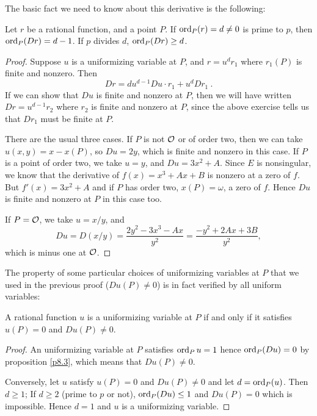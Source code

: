 The basic fact we need to know about this derivative is the following:

\begin{prop}
\label{p8.3}
Let $r$ be a rational function, and a point $P$. If $\operatorname{ord}_{P}(r)=d\neq 0$ is prime to $p$, then $\operatorname{ord}_{P}(Dr)=d-1$. If $p$ divides $d$,  $\operatorname{ord}_{P}(Dr)\geq d$.
\end{prop}

\begin{proof} Suppose $u$ is a uniformizing variable at $P$, and $r=u^{d}r_{1}$ where $r_{1}(P)$ is finite and nonzero. Then
$$
Dr=du^{d-1}Du\cdot r_{1}+u^{d}Dr_{1}\ .
$$
If we can show that $Du$ is finite and nonzero at $P$, then we will have written $Dr=u^{d-1}r_{2}$ where $r_{2}$ is finite and nonzero at $P$, since the above exercise tells us that $Dr_{1}$ must be finite at $P$. 

There are the usual three cases. If $P$ is not $\mathcal{O}$ or of order two, then we can take $u(x, y)=x-x(P)$, so $Du=2y$, which is finite and nonzero in this case. If $P$ is a point of order two, we take $u=y$, and $Du=3x^{2}+A$. Since $E$ is nonsingular, we know that the derivative of $f(x)=x^{3}+Ax+B$ is nonzero at a zero of $f$. But $f'(x)=3x^{2}+A$ and if $P$ has order two, $ x(P)=\omega$, a zero of $f$. Hence $Du$ is finite and nonzero at $P$ in this case too.

If $P=\mathcal{O}$, we take $u=x/y$, and
$$
Du=D(x/y)=\frac{2y^{2}-3x^{3}-Ax}{y^{2}}=\frac{-y^{2}+2Ax+3B}{y^{2}},
$$
which is minus one at $\mathcal{O}$.
\end{proof}

The property of some particular choices of uniformizing variables at $P$ that we used in the previous proof ($Du(P) \neq 0$) is in fact verified by all uniform variables:

\begin{coro}
\label{coro:unif:var:carac:der}
A rational function $u$ is a uniformizing variable at $P$ if and only if it satisfies $u(P)=0$ and $Du(P)\neq 0$.
\end{coro}

\begin{proof}
An uniformizing variable at $P$ satisfies $\operatorname{ord}_{P} u = 1$ hence $\operatorname{ord}_{P}(Du)=0$ by proposition \ref{p8.3}, which means that $Du(P) \neq 0$.

Conversely, let $u$ satisfy  $u(P)=0$ and $Du(P)\neq 0$ and let $d=\operatorname{ord}_{P}(u)$. Then $d \geq 1$; If $d\geq 2$ (prime to $p$ or not), $\operatorname{ord}_{P}(Du) \leq 1$ and $Du(P)=0$ which is impossible. Hence $d=1$ and $u$ is a uniformizing variable. 
\end{proof}

